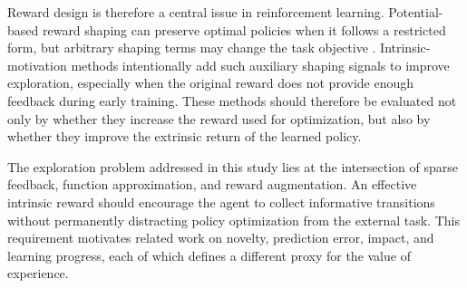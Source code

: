 Reward design is therefore a central issue in reinforcement learning.
Potential-based reward shaping can preserve optimal policies when it follows a restricted form, but arbitrary shaping terms may change the task objective  \parencite{ng-1999}.
Intrinsic-motivation methods intentionally add such auxiliary shaping signals to improve exploration, especially when the original reward does not provide enough feedback during early training.
These methods should therefore be evaluated not only by whether they increase the reward used for optimization, but also by whether they improve the extrinsic return of the learned policy.

The exploration problem addressed in this study lies at the intersection of sparse feedback, function approximation, and reward augmentation.
An effective intrinsic reward should encourage the agent to collect informative transitions without permanently distracting policy optimization from the external task.
This requirement motivates related work on novelty, prediction error, impact, and learning progress, each of which defines a different proxy for the value of experience.
